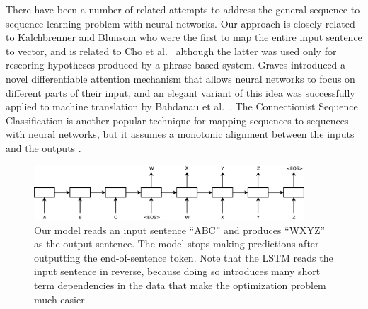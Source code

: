 There have been a number of related attempts to address the general
sequence to sequence learning problem with neural networks.   Our
approach is closely related to Kalchbrenner and Blunsom \cite{kal13} who were
the first to map the entire input sentence to vector, and is related 
to Cho et al.~\cite{cho14} although the latter was used only for rescoring hypotheses
produced by a phrase-based system.  Graves
\cite{graves13c} introduced a novel differentiable attention mechanism
that allows neural networks to focus on different parts
of their input, and an elegant variant of this idea was successfully
applied to machine translation by Bahdanau et al.~\cite{bog14}.  The Connectionist
Sequence Classification is another popular technique for mapping sequences
to sequences with neural networks, but it assumes a monotonic alignment
between the inputs and the outputs \cite{graves1}.



\begin{figure}[h]
\centering \includegraphics[width=0.9\textwidth]{Diagram1.eps}
\caption{\small Our model reads an input sentence ``ABC'' and produces
  ``WXYZ'' as the output sentence.  The model stops making predictions
  after outputting the end-of-sentence token.  Note that the LSTM
  reads the input sentence in reverse, because doing so introduces
  many short term dependencies in the data that make the optimization
  problem much easier. }
\label{fig:translation-model2}
\end{figure}


